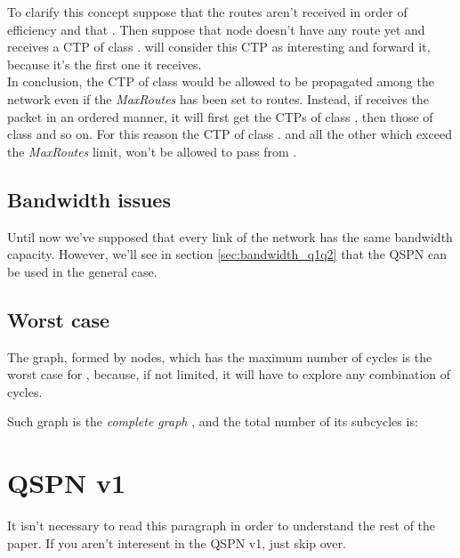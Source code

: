 \documentclass[a4paper]{article}
\begin{document}
To clarify this concept suppose that the routes aren't received in order of
efficiency and that . Then suppose that node  doesn't
have any route yet and receives a CTP of class .  will consider this
CTP as interesting and forward it, because it's the first one it receives.\\
In conclusion, the CTP of class  would be allowed to be propagated among
the network even if the \emph{MaxRoutes} has been set to  routes.
Instead, if  receives the packet in an ordered
manner, it will first get the CTPs of class , then those of class 
and so on. For this reason the CTP of class . and all the other which
exceed the \emph{MaxRoutes} limit, won't be allowed to pass from .

\subsection{Bandwidth issues}
Until now we've supposed that every link of the network has the same bandwidth
capacity. However, we'll see in section \ref{sec:bandwidth_q1q2} that the QSPN
can be used in the general case.

\subsection{Worst case}
\label{worstcase}
The graph, formed by  nodes, which has the maximum number of cycles is the
worst case for , because, if not limited, it will have to explore any
combination of cycles.

Such graph is the \emph{complete graph} \cite{completegraph}, and the total
number of its subcycles is:


\section{QSPN v1}
\label{sec:QSPNv1}
\small{It isn't necessary to read this paragraph in order to understand the
rest of the paper. If you aren't interesent in the QSPN v1, just skip over.}
\end{document}
